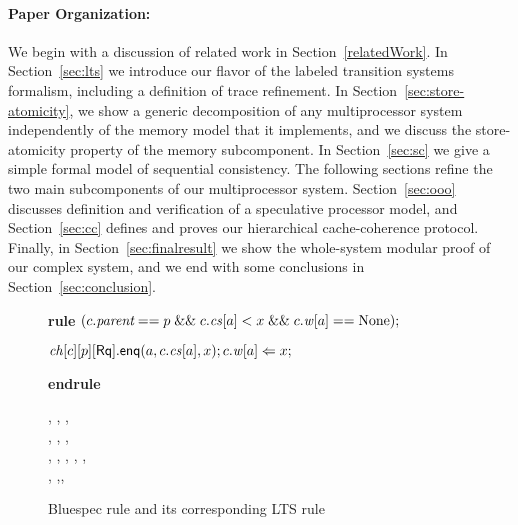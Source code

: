\paragraph{Paper Organization:} We begin with a discussion of related work in
Section~\ref{relatedWork}. In Section~\ref{sec:lts} we introduce our flavor of
the labeled transition systems formalism, including a definition of trace
refinement. In Section~\ref{sec:store-atomicity}, we show a generic
decomposition of any multiprocessor system independently of the memory model
that it implements, and we discuss the store-atomicity property of the memory
subcomponent. In Section~\ref{sec:sc} we give a simple formal model of
sequential consistency.  The following sections refine the two main
subcomponents of our multiprocessor system.  Section~\ref{sec:ooo} discusses
definition and verification of a speculative processor model, and
Section~\ref{sec:cc} defines and proves our hierarchical cache-coherence
protocol.  Finally, in Section~\ref{sec:finalresult} we show the whole-system
modular proof of our complex system, and we end with some conclusions in
Section~\ref{sec:conclusion}.

\begin{figure}[t]
\centering
\begin{boxedminipage}{\columnwidth}
\small
\noindent \textbf{rule} $(c.\textit{parent} == p \; \mathit{\&\&} \; c.\mathit{cs}[a] < x \; \mathit{\&\&} \; c.\mathit{w}[a]== \textrm{None});$

\hspace{1cm} $\mathit{ch}[c][p][\mathsf{Rq}].\mathsf{enq}(a,c.\mathit{cs}[a],x); c.\mathit{w}[a] \Leftarrow x;$

\textbf{endrule}
\end{boxedminipage}
\begin{boxedminipage}{\columnwidth}
\small
{}
{\hspace{-.4cm}
{\hspace{-.2cm}\dt, \ch, \s,\hspace{-.2cm}\\
\hspace{-.2cm}\dst, \wt, \dwt,\hspace{-.2cm}\\
\hspace{-.2cm}\inp, \outp\hspace{-.2cm}}
{\hspace{-.2cm}\dt, , \s, \dst,\hspace{-.2cm}\\
\hspace{-.2cm}\wt[(c,a)\coloneqq x], \dwt,\inp, \outp\hspace{-.2cm}}{}\hspace{-.4cm}}
\end{boxedminipage}
\caption{Bluespec rule and its corresponding LTS rule}
\label{both}
\end{figure}

